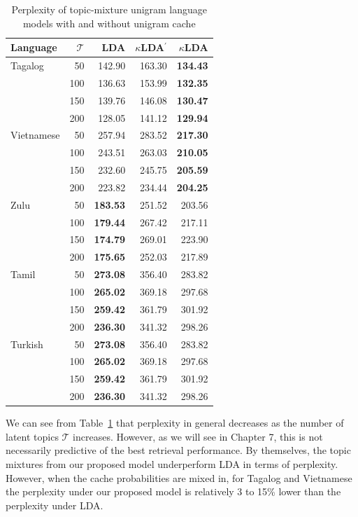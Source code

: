 \begin{table}[t]
\centering
   \begin{tabular}{lrrrr}
Language & $\mathcal{T}$ & \textbf{LDA} & \textbf{$\kappa$LDA$^\prime$} & \textbf{$\kappa$LDA} \\ \midrule
 \rowcolor{blue!6} Tagalog & 50   &  142.90  & 163.30 & \textbf{134.43} \\
 \rowcolor{blue!6}& 100  & 136.63 & 153.99 & \textbf{132.35} \\
\rowcolor{blue!6} & 150  & 139.76 & 146.08 & \textbf{130.47} \\
 \rowcolor{blue!6} & 200 & 128.05 & 141.12 & \textbf{129.94} \\[1ex]
 \rowcolor{blue!6} Vietnamese & 50 & 257.94 & 283.52 &  \textbf{217.30} \\
 \rowcolor{blue!6} & 100  & 243.51  & 263.03 & \textbf{210.05} \\
 \rowcolor{blue!6} & 150  & 232.60  & 245.75 & \textbf{205.59} \\
 \rowcolor{blue!6} & 200  & 223.82  & 234.44 &\textbf{204.25} \\[1ex]
Zulu & 50 & \textbf{183.53} & 251.52 & 203.56 \\
& 100  & \textbf{179.44} & 267.42 & 217.11 \\
& 150 & \textbf{174.79} & 269.01 & 223.90 \\
& 200  & \textbf{175.65} & 252.03 & 217.89 \\[1ex] 
Tamil & 50 &\textbf{273.08} & 356.40 & 283.82 \\ 
& 100 & \textbf{265.02} & 369.18 & 297.68 \\ 
& 150 & \textbf{259.42} & 361.79 & 301.92 \\ 
& 200 &\textbf{236.30} & 341.32 &  298.26  \\
Turkish & 50 &\textbf{273.08} & 356.40 & 283.82  \\ 
& 100 & \textbf{265.02} & 369.18 & 297.68 \\ 
& 150 & \textbf{259.42} & 361.79 & 301.92 \\ 
& 200 &\textbf{236.30} & 341.32 &  298.26 \\
\end{tabular}
\caption[Perplexity of topic-mixture unigram LMs]{ Perplexity of topic-mixture unigram language models with and without unigram cache \label{tab6:devppl} }
\end{table}

We can see from Table~\ref{tab6:devppl} that perplexity in general decreases as the number of latent topics $\mathcal{T}$ increases.  However, as we will see in Chapter 7, this is not necessarily predictive of the best retrieval performance.  By themselves, the topic mixtures from our proposed model underperform LDA in terms of perplexity.  However, when the cache probabilities are mixed in, for Tagalog and Vietnamese the perplexity under our proposed model is relatively 3 to 15\% lower than the perplexity under LDA.

